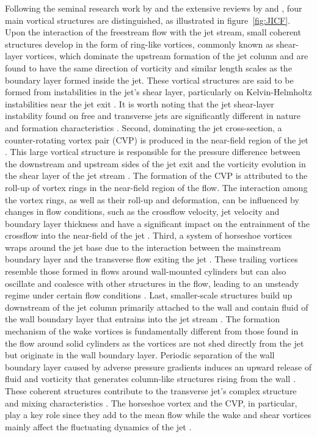 Following the seminal research work by \citet{fric_roshko_1994} and the extensive reviews by \citet{Mahesh2013revJICF} and \citet{Karagozian2014revJICF}, four main vortical structures are distinguished, as illustrated in figure~\ref{fig:JICF}. Upon the interaction of the freestream flow with the jet stream, small coherent structures develop in the form of ring-like vortices, commonly known as shear-layer vortices, which dominate the upstream formation of the jet column and are found to have the same direction of vorticity and similar length scales as the boundary layer formed inside the jet. These vortical structures are said to be formed from instabilities in the jet's shear layer, particularly on Kelvin-Helmholtz instabilities near the jet exit \citep{fric_roshko_1994, kelso1996experimental}. It is worth noting that the jet shear-layer instability found on free and transverse jets are significantly different in nature and formation characteristics \citep{megerian2007transverse}. Second, dominating the jet cross-section, a counter-rotating vortex pair (CVP) is produced in the near-field region of the jet \citep{kamotani1972experiments}. This large vortical structure is responsible for the pressure difference between the downstream and upstream sides of the jet exit and the vorticity evolution in the shear layer of the jet stream \citep{andreopoulos1984experimental, cortelezzi2001formation}. The formation of the CVP is attributed to the roll-up of vortex rings in the near-field region of the flow. The interaction among the vortex rings, as well as their roll-up and deformation, can be influenced by changes in flow conditions, such as the crossflow velocity, jet velocity and boundary layer thickness and have a significant impact on the entrainment of the crossflow into the near-field of the jet \citep{smith1998mixing,kamotani1972experiments,cortelezzi2001formation}. Third, a system of horseshoe vortices wraps around the jet base \citep{Krothapalli1990HSvort} due to the interaction between the mainstream boundary layer and the transverse flow exiting the jet \citep{kelso1995horseshoe}. These trailing vortices resemble those formed in flows around wall-mounted cylinders but can also oscillate and coalesce with other structures in the flow, leading to an unsteady regime under certain flow conditions \citep{kelso1995horseshoe}. Last, smaller-scale structures build up downstream of the jet column primarily attached to the wall and contain fluid of the wall boundary layer that entrains into the jet stream \citep{fric_roshko_1994}. The formation mechanism of the wake vortices is fundamentally different from those found in the flow around solid cylinders as the vortices are not shed directly from the jet but originate in the wall boundary layer. Periodic separation of the wall boundary layer caused by adverse pressure gradients induces an upward release of fluid and vorticity that generates column-like structures rising from the wall \citep{fric_roshko_1994}. These coherent structures contribute to the transverse jet's complex structure and mixing characteristics \citep{smith1998mixing}. The horseshoe vortex and the CVP, in particular, play a key role since they add to the mean flow while the wake and shear vortices mainly affect the fluctuating dynamics of the jet \citep{karagozian1986analytical}.

